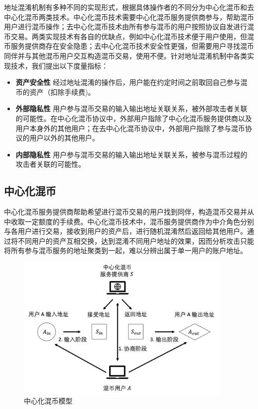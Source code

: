 地址混淆机制有多种不同的实现形式，根据具体操作者的不同分为中心化混币和去中心化混币两类技术。中心化混币技术需要中心化混币服务提供商参与，帮助混币用户进行混币操作；去中心化混币技术由所有参与混币的用户按照协议自发进行混币交易。两类实现技术有各自的优缺点，例如中心化混币技术便于用户使用，但混币服务提供商存在安全隐患；去中心化混币技术安全性更强，但需要用户寻找混币同伴并与其他混币用户交互构造混币交易，使用不便。针对地址混淆机制中各类实现技术，我们提出以下度量指标：

\begin{itemize}
	\item \textbf{资产安全性} 经过地址混淆的操作后，用户能在约定时间之前取回自己参与混币的资产（扣除手续费)。
	\item \textbf{外部隐私性} 用户参与混币交易的输入输出地址关联关系，被外部攻击者关联的可能性。在中心化混币协议中，外部用户指除了中心化混币服务提供商以及用户本身外的其他用户；在去中心化混币协议中，外部用户指除了参与混币协议的用户以外的其他用户。
	\item \textbf{内部隐私性} 用户参与混币交易的输入输出地址关联关系，被参与混币过程的攻击者关联的可能性。
\end{itemize}

\subsection{中心化混币}

中心化混币服务提供商帮助希望进行混币交易的用户找到同伴，构造混币交易并从中收取一定额度的手续费。中心化混币技术中，混币服务提供商作为中介角色分别与各用户进行交易，接收到用户的资产后，进行随机混淆然后返回给其他用户。通过将不同用户的资产互相交换，达到混淆不同用户地址的效果，因而分析攻击只能将所有参与混币服务的地址聚类到一起，难以分辨出属于单一用户的账户地址。

\begin{figure}
\centering
\includegraphics[height=7cm]{figures/cen-mixer.png}
\caption{中心化混币模型}
\label{fig:cen-mixer}
\end{figure}

